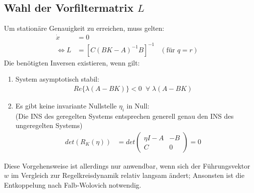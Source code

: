 \documentclass[a4paper,twocolumn,10pt]{article}
\begin{document}
\subsection{Wahl der Vorfiltermatrix $L$}
Um stationäre Genauigkeit zu erreichen, muss gelten:
\begin{align*}
\dot{x}&=0\\
\Leftrightarrow L&=\left[C(BK-A)^{-1}B\right]^{-1}\;\;\;(\text{für }q=r)
\end{align*}
Die benötigten Inversen existieren, wenn gilt:
\begin{enumerate}
\item System asymptotisch stabil:
\begin{align*}
Re\{\lambda(A-BK)\}<0\;\;\forall\;\lambda(A-BK)
\end{align*}
\item Es gibt keine invariante Nullstelle $\eta_i$ in Null:\\
(Die INS des geregelten Systems entsprechen generell genau den INS des ungeregelten Systems)
\begin{align*}
det(R_K(\eta))&=det\begin{pmatrix}\eta I-A & -B \\ C & 0\end{pmatrix}=0
\end{align*}
\end{enumerate}
Diese Vorgehensweise ist allerdings nur anwendbar, wenn sich der Führungsvektor $w$ im Vergleich zur Regelkreisdynamik relativ langsam ändert; Ansonsten ist die Entkoppelung nach Falb-Wolovich notwendig.
\end{document}
